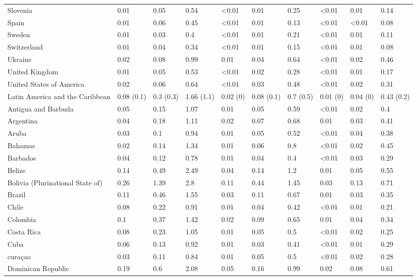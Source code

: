 \begin{longtable}[t]{llllllllll}
Slovenia & 0.01 & 0.05 & 0.54 & <0.01 & 0.01 & 0.25 & <0.01 & 0.01 & 0.14\\
\addlinespace
Spain & 0.01 & 0.06 & 0.45 & <0.01 & 0.01 & 0.13 & <0.01 & <0.01 & 0.08\\
Sweden & 0.01 & 0.03 & 0.4 & <0.01 & 0.01 & 0.21 & <0.01 & 0.01 & 0.11\\
Switzerland & 0.01 & 0.04 & 0.34 & <0.01 & 0.01 & 0.15 & <0.01 & 0.01 & 0.08\\
Ukraine & 0.02 & 0.08 & 0.99 & 0.01 & 0.04 & 0.64 & <0.01 & 0.02 & 0.46\\
United Kingdom & 0.01 & 0.05 & 0.53 & <0.01 & 0.02 & 0.28 & <0.01 & 0.01 & 0.17\\
\addlinespace
United States of America & 0.02 & 0.06 & 0.64 & <0.01 & 0.03 & 0.48 & <0.01 & 0.02 & 0.31\\
Latin America and the Caribbean & 0.08 (0.1) & 0.3 (0.3) & 1.66 (1.1) & 0.02 (0) & 0.08 (0.1) & 0.7 (0.5) & 0.01 (0) & 0.04 (0) & 0.43 (0.2)\\
Antigua and Barbuda & 0.05 & 0.15 & 1.07 & 0.01 & 0.05 & 0.59 & <0.01 & 0.02 & 0.4\\
Argentina & 0.04 & 0.18 & 1.11 & 0.02 & 0.07 & 0.68 & 0.01 & 0.03 & 0.41\\
Aruba & 0.03 & 0.1 & 0.94 & 0.01 & 0.05 & 0.52 & <0.01 & 0.04 & 0.38\\
\addlinespace
Bahamas & 0.02 & 0.14 & 1.34 & 0.01 & 0.06 & 0.8 & <0.01 & 0.02 & 0.45\\
Barbados & 0.04 & 0.12 & 0.78 & 0.01 & 0.04 & 0.4 & <0.01 & 0.03 & 0.29\\
Belize & 0.14 & 0.49 & 2.49 & 0.04 & 0.14 & 1.2 & 0.01 & 0.05 & 0.55\\
Bolivia (Plurinational State of) & 0.26 & 1.39 & 2.8 & 0.11 & 0.44 & 1.45 & 0.03 & 0.13 & 0.71\\
Brazil & 0.11 & 0.46 & 1.55 & 0.03 & 0.11 & 0.67 & 0.01 & 0.03 & 0.35\\
\addlinespace
Chile & 0.08 & 0.22 & 0.91 & 0.01 & 0.04 & 0.42 & <0.01 & 0.01 & 0.21\\
Colombia & 0.1 & 0.37 & 1.42 & 0.02 & 0.09 & 0.65 & 0.01 & 0.04 & 0.34\\
Costa Rica & 0.08 & 0.23 & 1.05 & 0.01 & 0.05 & 0.5 & <0.01 & 0.02 & 0.25\\
Cuba & 0.06 & 0.13 & 0.92 & 0.01 & 0.03 & 0.41 & <0.01 & 0.01 & 0.29\\
curaçao & 0.03 & 0.11 & 0.84 & 0.01 & 0.05 & 0.5 & <0.01 & 0.02 & 0.28\\
\addlinespace
Dominican Republic & 0.19 & 0.6 & 2.08 & 0.05 & 0.16 & 0.99 & 0.02 & 0.08 & 0.61\\

\end{longtable}
